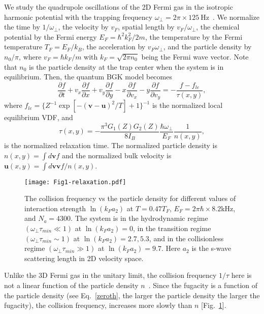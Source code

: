 We study the quadrupole oscillations of the 2D Fermi gas in the isotropic harmonic potential with the trapping frequency $\omega_\bot=2\pi\times125~$Hz~\cite{Vogt2012}. We normalize the time by $1/\omega_\bot$,  the velocity by $v_F$, spatial length by $v_F/\omega_\bot$, the chemical potential by the Fermi energy $E_F=\hbar^2k_F^2/2m$, the temperature by the Fermi temperature $T_F=E_F/k_B$, the acceleration by $v_F\omega_\bot$, and the particle density by $n_0/\pi$, where $v_F=\hbar{k_F}/m$ with $k_F=\sqrt{2\pi{n_0}}$ being the Fermi wave vector. Note that $n_0$ is the particle density at the trap center when the system is in equilibrium. Then, the quantum BGK model becomes
\begin{equation}\label{BGK}
\frac{\partial f}{\partial t}+v_x \frac{\partial f}{\partial
	x}+v_y \frac{\partial f}{\partial
	y}-x\frac{\partial f}{\partial
	v_x}-y\frac{\partial
	f}{\partial v_y}=-\frac{f-f_{le}}{\tau(x,y)},
\end{equation}
where $f_{le}=\{Z^{-1}\exp[-(\bm{v}-\bm{u})^2/T]+1\}^{-1}$ is the normalized local equilibrium VDF,  and
\begin{equation}\label{relaxation}
\tau(x,y)=-\frac{\pi^3G_1(Z)G_2(Z)}{8I_B}\frac{\hbar\omega_\bot}{E_F}\frac{1}{n(x,y)},
\end{equation}
is the normalized relaxation time. The normalized particle density is $n(x,y)=\int{d}\bm{v} f$ and the normalized bulk velocity is $\bm{u}(x,y)=\int{d}\bm{v} \bm{v}f/n(x,y)$.


\begin{figure}[t]
	\centering
	\texttt{[image: Fig1-relaxation.pdf]}
	\caption[The collision frequency vs the particle density for different values of interaction strength $\ln(k_Fa_2)$ at $T=0.47T_F$, $E_F=2\pi\hbar\times8.2~$kHz, and $N_a=4300$.]{ The collision frequency vs the particle density for different values of interaction strength $\ln(k_Fa_2)$ at $T=0.47T_F$, $E_F=2\pi\hbar\times8.2$kHz, and $N_a=4300$. The system is in the hydrodynamic regime $(\omega_\bot\tau_{min}\ll1)$ at $\ln(k_Fa_2)=0$, in the transition regime $(\omega_\bot\tau_{min}\sim1)$ at $\ln(k_Fa_2)=2.7, 5.3$, and in the collisionless regime $(\omega_\bot\tau_{min}\gg1)$ at $\ln(k_Fa_2)=9.7$. Here $a_2$ is the s-wave scattering length in 2D velocity space.}
	\label{fig_relaxation}
\end{figure}

Unlike the 3D Fermi gas in the unitary limit, the collision frequency $1/\tau$ here is not a linear function of the particle density $n$~\cite{Massignan2005}. Since the fugacity is a function of the particle density (see Eq.~\eqref{zeroth}, the larger the particle density the larger the fugacity), the collision frequency, increases more slowly than $n$ [Fig.~\ref{fig_relaxation}].

